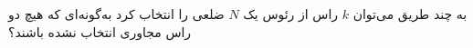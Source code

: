 \EXERCISE
به چند طریق می‌توان
$k$
راس از رئوس یک
$N$
ضلعی را انتخاب کرد به‌گونه‌ای که هیچ دو راس مجاوری انتخاب نشده باشند؟